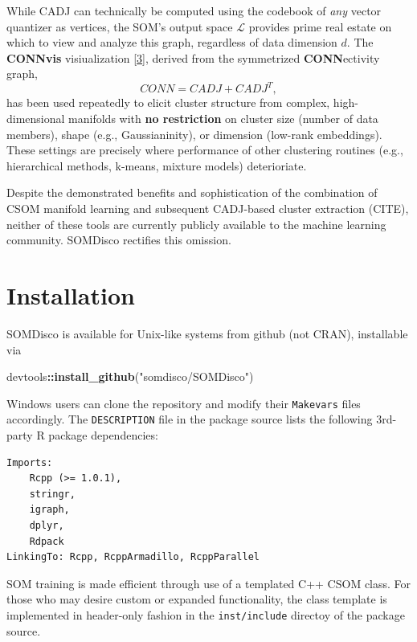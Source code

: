 \documentclass[]{article}
\newenvironment{Shaded}{\begin{snugshade}}{\end{snugshade}}
\newcommand{\KeywordTok}[1]{\textcolor[rgb]{0.13,0.29,0.53}{\textbf{#1}}}
\newcommand{\NormalTok}[1]{#1}
\newcommand{\OperatorTok}[1]{\textcolor[rgb]{0.81,0.36,0.00}{\textbf{#1}}}
\newcommand{\StringTok}[1]{\textcolor[rgb]{0.31,0.60,0.02}{#1}}
\begin{document}
While CADJ can technically be computed using the codebook of \emph{any} vector quantizer as vertices, the SOM's output space \(\mathcal{L}\) provides prime real estate on which to view and analyze this graph, regardless of data dimension \(d\). The \textbf{CONNvis} visiualization {[}\protect\hyperlink{ref-TasdemirMerenyi2009}{3}{]}, derived from the symmetrized \textbf{CONN}ectivity graph,
\[CONN = CADJ + CADJ^T,\]
has been used repeatedly to elicit cluster structure from complex, high-dimensional manifolds with \textbf{no restriction} on cluster size (number of data members), shape (e.g., Gaussianinity), or dimension (low-rank embeddings). These settings are precisely where performance of other clustering routines (e.g., hierarchical methods, k-means, mixture models) deterioriate.

Despite the demonstrated benefits and sophistication of the combination of CSOM manifold learning and subsequent CADJ-based cluster extraction (CITE), neither of these tools are currently publicly available to the machine learning community. SOMDisco rectifies this omission.

\hypertarget{installation}{%
\section{Installation}\label{installation}}

SOMDisco is available for Unix-like systems from github (not CRAN), installable via

\begin{Shaded}
\begin{Highlighting}[]
\NormalTok{devtools}\OperatorTok{::}\KeywordTok{install_github}\NormalTok{(}\StringTok{"somdisco/SOMDisco"}\NormalTok{)}
\end{Highlighting}
\end{Shaded}

Windows users can clone the repository and modify their \texttt{Makevars} files accordingly. The \texttt{DESCRIPTION} file in the package source lists the following 3rd-party R package dependencies:

\begin{verbatim}
Imports: 
    Rcpp (>= 1.0.1), 
    stringr, 
    igraph, 
    dplyr, 
    Rdpack
LinkingTo: Rcpp, RcppArmadillo, RcppParallel
\end{verbatim}

SOM training is made efficient through use of a templated C++ CSOM class. For those who may desire custom or expanded functionality, the class template is implemented in header-only fashion in the \texttt{inst/include} directoy of the package source.
\end{document}

